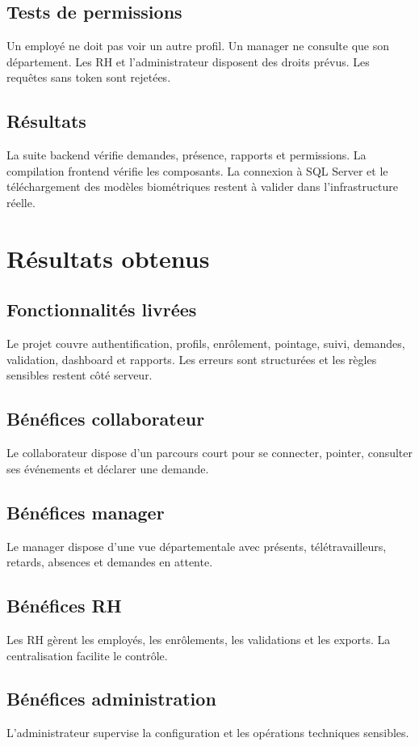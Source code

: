 \documentclass[11pt,a4paper,oneside]{report}
\begin{document}
\section{Tests de permissions}
Un employé ne doit pas voir un autre profil. Un manager ne consulte que son département. Les RH et l'administrateur disposent des droits prévus. Les requêtes sans token sont rejetées.
\section{Résultats}
La suite backend vérifie demandes, présence, rapports et permissions. La compilation frontend vérifie les composants. La connexion à SQL Server et le téléchargement des modèles biométriques restent à valider dans l'infrastructure réelle.

\chapter{Résultats obtenus}
\section{Fonctionnalités livrées}
Le projet couvre authentification, profils, enrôlement, pointage, suivi, demandes, validation, dashboard et rapports. Les erreurs sont structurées et les règles sensibles restent côté serveur.
\section{Bénéfices collaborateur}
Le collaborateur dispose d'un parcours court pour se connecter, pointer, consulter ses événements et déclarer une demande.
\section{Bénéfices manager}
Le manager dispose d'une vue départementale avec présents, télétravailleurs, retards, absences et demandes en attente.
\section{Bénéfices RH}
Les RH gèrent les employés, les enrôlements, les validations et les exports. La centralisation facilite le contrôle.
\section{Bénéfices administration}
L'administrateur supervise la configuration et les opérations techniques sensibles.
\end{document}
